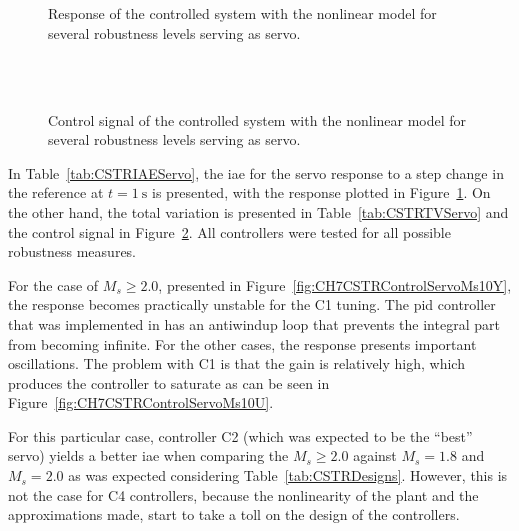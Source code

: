 %
\begin{figure}
	\centering
	\\
	\\
	\caption{Response of the controlled system with the nonlinear model for several robustness levels serving as servo.}
	\label{fig:CH7CSTRControlServoY}
\end{figure}
%
%
\begin{figure}
	\centering
	\\
	\\
	\caption{Control signal of the controlled system with the nonlinear model for several robustness levels serving as servo.}
	\label{fig:CH7CSTRControlServoU}
\end{figure}
%
In Table~\ref{tab:CSTRIAEServo}, the \gls{iae} for the servo response to a step change in the reference at $t= \SI{1}{\second}$ is presented, with the response  plotted in Figure~\ref{fig:CH7CSTRControlServoY}. On the other hand, the total variation is presented in Table~\ref{tab:CSTRTVServo} and the control signal in Figure~\ref{fig:CH7CSTRControlServoU}. All controllers were tested for all possible robustness measures.

For the case of $M_s \geq 2.0$, presented in Figure~\ref{fig:CH7CSTRControlServoMs10Y}, the response becomes practically unstable for the C1 tuning. The \gls{pid} controller that was implemented in \simulink{} has an antiwindup loop that prevents the integral part from becoming infinite. For the other cases, the response presents important oscillations. The problem with C1 is that the gain is relatively high, which produces the controller to saturate as can be seen in Figure~\ref{fig:CH7CSTRControlServoMs10U}.

For this particular case, controller C2 (which was expected to be the ``best'' servo) yields a better \gls{iae} when comparing the $M_s \geq 2.0$ against $M_s = 1.8$ and $M_s = 2.0$ as was expected considering Table~\ref{tab:CSTRDesigns}. However, this is not the case for C4 controllers, because the nonlinearity of the plant and the approximations made, start to take a toll on the design of the controllers.

